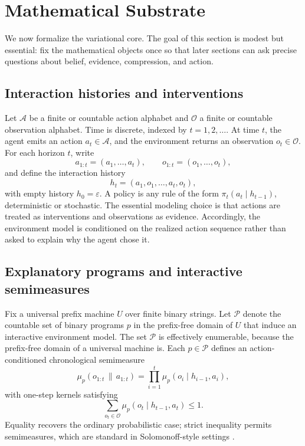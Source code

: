 \documentclass[11pt]{article}
\theoremstyle{remark}
\newcommand{\Acal}{\mathcal{A}}
\newcommand{\Ocal}{\mathcal{O}}
\newcommand{\Pcal}{\mathcal{P}}
\newcommand{\givena}{\,\|\,}
\begin{document}
\section{Mathematical Substrate}
\label{sec:substrate}

We now formalize the variational core. The goal of this section is modest but essential: fix the mathematical objects once so that later sections can ask precise questions about belief, evidence, compression, and action.

\subsection{Interaction histories and interventions}

Let \(\Acal\) be a finite or countable action alphabet and \(\Ocal\) a finite or countable observation alphabet. Time is discrete, indexed by \(t = 1,2,\dots\). At time \(t\), the agent emits an action \(a_t \in \Acal\), and the environment returns an observation \(o_t \in \Ocal\). For each horizon \(t\), write
\[
a_{1:t} = (a_1,\dots,a_t), \qquad o_{1:t} = (o_1,\dots,o_t),
\]
and define the interaction history
\[
h_t = (a_1,o_1,\dots,a_t,o_t),
\]
with empty history \(h_0 = \varepsilon\). A policy is any rule of the form \(\pi_t(a_t \mid h_{t-1})\), deterministic or stochastic. The essential modeling choice is that actions are treated as interventions and observations as evidence. Accordingly, the environment model is conditioned on the realized action sequence rather than asked to explain why the agent chose it.

\subsection{Explanatory programs and interactive semimeasures}

Fix a universal prefix machine \(U\) over finite binary strings. Let \(\Pcal\) denote the countable set of binary programs \(p\) in the prefix-free domain of \(U\) that induce an interactive environment model. The set \(\Pcal\) is effectively enumerable, because the prefix-free domain of a universal machine is. Each \(p \in \Pcal\) defines an action-conditioned chronological semimeasure
\[
\mu_p(o_{1:t} \givena a_{1:t})
= \prod_{i=1}^{t} \mu_p(o_i \mid h_{i-1}, a_i),
\]
with one-step kernels satisfying
\[
\sum_{o_t \in \Ocal} \mu_p(o_t \mid h_{t-1}, a_t) \le 1.
\]
Equality recovers the ordinary probabilistic case; strict inequality permits semimeasures, which are standard in Solomonoff-style settings \citep{Solomonoff1964a,Solomonoff1964b}.
\end{document}

